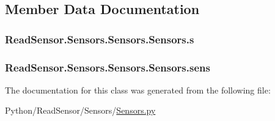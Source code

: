 \subsection{Member Data Documentation}
\subsubsection[{\texorpdfstring{s}{s}}]{\setlength{\rightskip}{0pt plus 5cm}Read\+Sensor.\+Sensors.\+Sensors.\+Sensors.\+s}\hypertarget{classReadSensor_1_1Sensors_1_1Sensors_1_1Sensors_a3b02e5ee66fce5c7ee146305bc82137b}{}\label{classReadSensor_1_1Sensors_1_1Sensors_1_1Sensors_a3b02e5ee66fce5c7ee146305bc82137b}
\subsubsection[{\texorpdfstring{sens}{sens}}]{\setlength{\rightskip}{0pt plus 5cm}Read\+Sensor.\+Sensors.\+Sensors.\+Sensors.\+sens}\hypertarget{classReadSensor_1_1Sensors_1_1Sensors_1_1Sensors_adb8986b5f974b88f52355bae4c331411}{}\label{classReadSensor_1_1Sensors_1_1Sensors_1_1Sensors_adb8986b5f974b88f52355bae4c331411}


The documentation for this class was generated from the following file\+:\begin{DoxyCompactItemize}
\item 
Python/\+Read\+Sensor/\+Sensors/\hyperlink{Sensors_8py}{Sensors.\+py}\end{DoxyCompactItemize}
